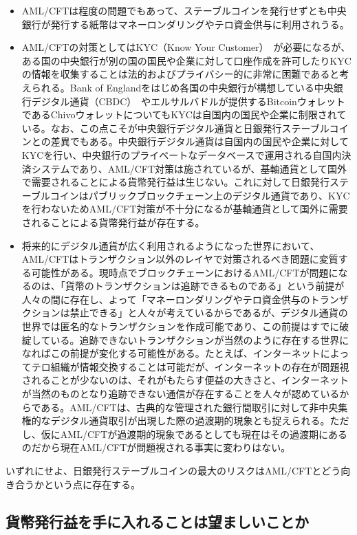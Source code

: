 \documentclass[dvipdfmx,a4paper]{jsarticle}
\begin{document}
\begin{itemize}
\item AML/CFTは程度の問題でもあって、ステーブルコインを発行せずとも中央銀行が発行する紙幣はマネーロンダリングやテロ資金供与に利用されうる。
\item AML/CFTの対策としてはKYC（Know Your Customer）~\cite{parra2017kyc}が必要になるが、ある国の中央銀行が別の国の国民や企業に対して口座作成を許可したりKYCの情報を収集することは法的およびプライバシー的に非常に困難であると考えられる。Bank of Englandをはじめ各国の中央銀行が構想している中央銀行デジタル通貨（CBDC）~\cite{cbdc1,cbdc2}やエルサルバドルが提供するBitcoinウォレットであるChivoウォレットについてもKYCは自国内の国民や企業に制限されている。なお、この点こそが中央銀行デジタル通貨と日銀発行ステーブルコインとの差異でもある。中央銀行デジタル通貨は自国内の国民や企業に対してKYCを行い、中央銀行のプライベートなデータベースで運用される自国内決済システムであり、AML/CFT対策は施されているが、基軸通貨として国外で需要されることによる貨幣発行益は生じない。これに対して日銀発行ステーブルコインはパブリックブロックチェーン上のデジタル通貨であり、KYCを行わないためAML/CFT対策が不十分になるが基軸通貨として国外に需要されることによる貨幣発行益が存在する。
\item 将来的にデジタル通貨が広く利用されるようになった世界において、AML/CFTはトランザクション以外のレイヤで対策されるべき問題に変質する可能性がある。現時点でブロックチェーンにおけるAML/CFTが問題になるのは、「貨幣のトランザクションは追跡できるものである」という前提が人々の間に存在し、よって「マネーロンダリングやテロ資金供与のトランザクションは禁止できる」と人々が考えているからであるが、デジタル通貨の世界では匿名的なトランザクションを作成可能であり、この前提はすでに破綻している。追跡できないトランザクションが当然のように存在する世界になればこの前提が変化する可能性がある。たとえば、インターネットによってテロ組織が情報交換することは可能だが、インターネットの存在が問題視されることが少ないのは、それがもたらす便益の大きさと、インターネットが当然のものとなり追跡できない通信が存在することを人々が認めているからである。AML/CFTは、古典的な管理された銀行間取引に対して非中央集権的なデジタル通貨取引が出現した際の過渡期的現象とも捉えられる。ただし、仮にAML/CFTが過渡期的現象であるとしても現在はその過渡期にあるのだから現在AML/CFTが問題視される事実に変わりはない。
\end{itemize}

いずれにせよ、日銀発行ステーブルコインの最大のリスクはAML/CFTとどう向き合うかという点に存在する。

\subsection{貨幣発行益を手に入れることは望ましいことか}
\end{document}
